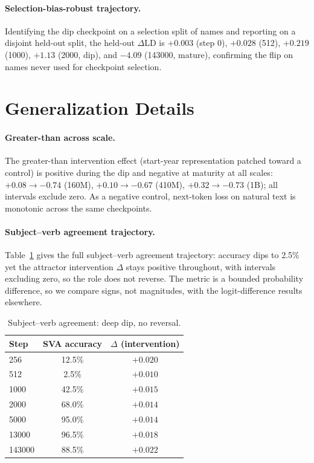\documentclass[11pt]{article}
\begin{document}
\paragraph{Selection-bias-robust trajectory.}
Identifying the dip checkpoint on a selection split of names and reporting on a
disjoint held-out split, the held-out $\Delta\mathrm{LD}$ is
$+0.003$ (step 0), $+0.028$ (512), $+0.219$ (1000),
$\mathbf{+1.13}$ (2000, dip), and $\mathbf{-4.09}$ (143000, mature), confirming
the flip on names never used for checkpoint selection.

\section{Generalization Details}
\paragraph{Greater-than across scale.}
The greater-than intervention effect (start-year representation patched toward a
control) is positive during the dip and negative at maturity at all scales:
$+0.08\to-0.74$ (160M), $+0.10\to-0.67$ (410M), $+0.32\to-0.73$ (1B); all
intervals exclude zero. As a negative control, next-token loss on natural text is
monotonic across the same checkpoints.

\paragraph{Subject--verb agreement trajectory.}
Table~\ref{tab:sva} gives the full subject--verb agreement trajectory: accuracy
dips to 2.5\% yet the attractor intervention $\Delta$ stays positive throughout,
with intervals excluding zero, so the role does not reverse. The metric is a
bounded probability difference, so we compare signs, not magnitudes, with the
logit-difference results elsewhere.

\begin{table}[h]
  \centering\small
  \begin{tabular}{lcc}
    \toprule
    Step & SVA accuracy & $\Delta$ (intervention) \\
    \midrule
    256    & 12.5\% & $+0.020$ \\
    512    & \phantom{0}2.5\% & $+0.010$ \\
    1000   & 42.5\% & $+0.015$ \\
    2000   & 68.0\% & $+0.014$ \\
    5000   & 95.0\% & $+0.014$ \\
    13000  & 96.5\% & $+0.018$ \\
    143000 & 88.5\% & $+0.022$ \\
    \bottomrule
  \end{tabular}
  \caption{Subject--verb agreement: deep dip, no reversal.}
  \label{tab:sva}
\end{table}
\end{document}
